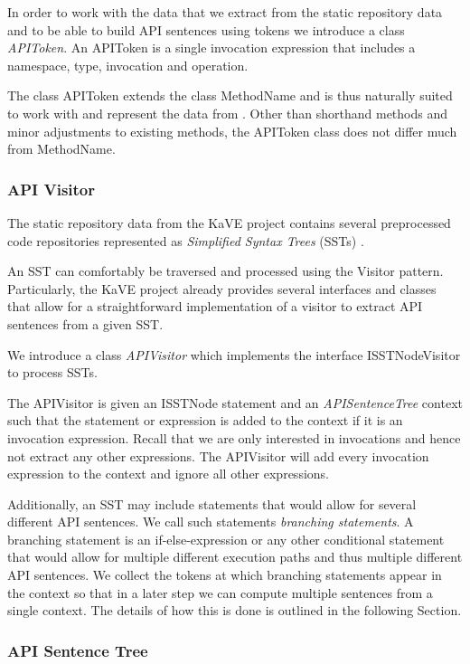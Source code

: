 In order to work with the data that we extract from the static repository data and to be able to build API sentences using tokens we introduce a class \textit{APIToken}.
An APIToken is a single invocation expression that includes a namespace, type, invocation and operation.

The class APIToken extends the class MethodName and is thus naturally suited to work with and represent the data from \cite{Kave}. Other than shorthand methods and minor adjustments to existing methods, the APIToken class does not differ much from MethodName.

\subsubsection{API Visitor}
\label{section-apivisitor}

The static repository data from the KaVE project contains several preprocessed code repositories represented as \textit{Simplified Syntax Trees} (SSTs) \cite{Kave}.

An SST can comfortably be traversed and processed using the Visitor pattern. Particularly, the KaVE project \cite{Kave} already provides several interfaces and classes that allow for a straightforward implementation of a visitor to extract API sentences from a given SST. 

We introduce a class \textit{APIVisitor} which implements the interface ISSTNodeVisitor to process SSTs.

The APIVisitor is given an ISSTNode statement and an \textit{APISentenceTree} context such that the statement or expression is added to the context if it is an invocation expression. Recall that we are only interested in invocations and hence not extract any other expressions. The APIVisitor will add every invocation expression to the context and ignore all other expressions.

Additionally, an SST may include statements that would allow for several different API sentences. We call such statements \textit{branching statements}. A branching statement is an if-else-expression or any other conditional statement that would allow for multiple different execution paths and thus multiple different API sentences. We collect the tokens at which branching statements appear in the context so that in a later step we can compute multiple sentences from a single context. The details of how this is done is outlined in the following Section.

\subsubsection{API Sentence Tree}
\label{section-apisentencetree}

